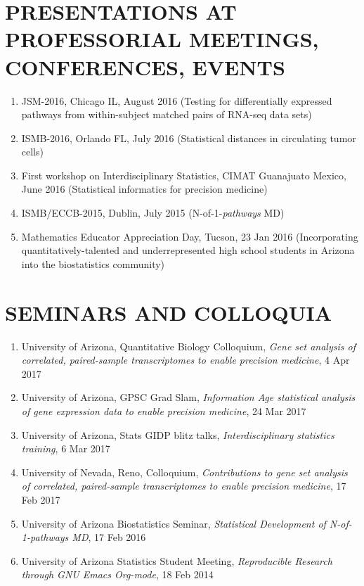 \documentclass[paper=a4,fontsize=11pt]{scrartcl} %
\newcommand{\NewPart}[2]{\section*{\uppercase{#1} #2 }}
\newcommand{\TalkEntry}[4]{
		\noindent #1, #2, #3 #4}
\begin{document}

\NewPart{Presentations at professorial meetings, conferences, events}{}
\vspace{-7pt}
\begin{enumerate}

\item\TalkEntry{JSM-2016}{Chicago IL}{August 2016}{(Testing for differentially expressed pathways from within-subject matched pairs of RNA-seq data sets)}
\item\TalkEntry{ISMB-2016}{Orlando FL}{July 2016}{(Statistical distances in circulating tumor cells)}
\item\TalkEntry{First workshop on Interdisciplinary Statistics}{CIMAT Guanajuato Mexico}{June 2016}{(Statistical informatics for precision medicine)} 
\item\TalkEntry{ISMB/ECCB-2015}{Dublin}{July 2015}{(N-of-1-\textit{pathways} MD)} 
\item\TalkEntry{2016 Mathematics Educator Appreciation Day}{Tucson}{23 Jan 2016}{(Incorporating quantitatively-talented and underrepresented high school students in Arizona into the biostatistics community)} 
\vspace{-7pt}
\end{enumerate}

\NewPart{Seminars and Colloquia}{}

\vspace{-7pt}
\begin{enumerate}
  
\item\TalkEntry{University of Arizona, Quantitative Biology Colloquium}{\textit{Gene set analysis of correlated, paired-sample transcriptomes to enable precision medicine}}{4 Apr 2017}{}  
  \item\TalkEntry{University of Arizona, GPSC Grad Slam}{\textit{Information Age statistical analysis of gene expression data to enable precision medicine}}{24 Mar 2017}{}
\item\TalkEntry{University of Arizona, Stats GIDP blitz talks}{\textit{Interdisciplinary statistics training}}{6 Mar 2017}{}

\item\TalkEntry{University of Nevada, Reno, Colloquium}{\textit{Contributions to gene set analysis of correlated, paired-sample transcriptomes to enable precision medicine}}{17 Feb 2017}{}

\item\TalkEntry{University of Arizona Biostatistics Seminar}{\textit{Statistical Development of N-of-1-pathways MD}}{17 Feb 2016}{}
\item\TalkEntry{University of Arizona Statistics Student Meeting}{\textit{Reproducible Research through GNU Emacs Org-mode}}{18 Feb 2014}{}
\vspace{-7pt}
\end{enumerate}
\end{document}
